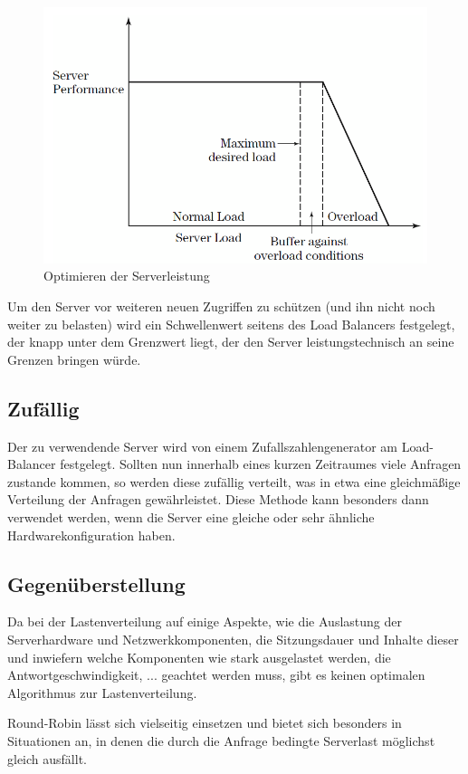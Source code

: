 \begin{figure}[!ht]
	\begin{center}
		\includegraphics[width=0.5\linewidth]{images/LoadBalancing_LoadThreshold.png}
		\caption{Optimieren der Serverleistung \cite{LoadBalancing2}}
		\label{ServerTheshold}
	\end{center}
\end{figure}

Um den Server vor weiteren neuen Zugriffen zu schützen (und ihn nicht noch weiter zu belasten) wird ein Schwellenwert seitens des Load Balancers festgelegt, der knapp unter dem Grenzwert liegt, der den Server leistungstechnisch an seine Grenzen bringen würde. \cite{LoadBalancing2}

\subsection{Zufällig}
\label{sec:Zufällig}
Der zu verwendende Server wird von einem Zufallszahlengenerator am Load-Balancer festgelegt. Sollten nun innerhalb eines kurzen Zeitraumes viele Anfragen zustande kommen, so werden diese zufällig verteilt, was in etwa eine gleichmäßige Verteilung der Anfragen gewährleistet.
Diese Methode kann besonders dann verwendet werden, wenn die Server eine gleiche oder sehr ähnliche Hardwarekonfiguration haben. \cite{WeightedLoadBalancingGrafik}

\subsection{Gegenüberstellung}
\label{sec:Gegenüberstellung}
Da bei der Lastenverteilung auf einige Aspekte, wie die Auslastung der Serverhardware und Netzwerkkomponenten, die Sitzungsdauer und Inhalte dieser und inwiefern welche Komponenten wie stark ausgelastet werden, die Antwortgeschwindigkeit, ... geachtet werden muss, gibt es keinen optimalen Algorithmus zur Lastenverteilung. \cite{LoadBalancing2}

Round-Robin lässt sich vielseitig einsetzen und bietet sich besonders in Situationen an, in denen die durch die Anfrage bedingte Serverlast möglichst gleich ausfällt.
 

